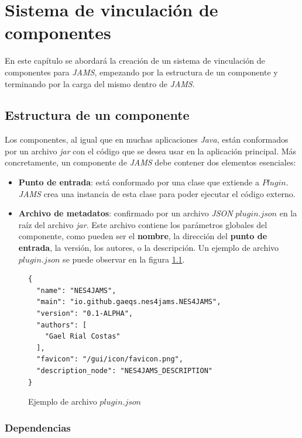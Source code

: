 \chapter{Sistema de vinculación de componentes}\label{ch:sistema-de-vinculacion-de-componentes}

En este capítulo se abordará la creación de un sistema de
vinculación de componentes para \textit{JAMS}, empezando por
la estructura de un componente y terminando por la carga
del mismo dentro de \textit{JAMS}.

\section{Estructura de un componente}\label{sec:estructura-de-un-componente}

Los componentes, al igual que en muchas aplicaciones \textit{Java},
están conformados por un archivo \textit{jar} con el código que
se desea usar en la aplicación principal.
Más concretamente, un componente de \textit{JAMS} debe contener
dos elementos esenciales:
\begin{itemize}
    \item \textbf{Punto de entrada}: está conformado por una
    clase que extiende a $Plugin$.
    \textit{JAMS} crea una instancia de esta clase para
    poder ejecutar el código externo.
    \item \textbf{Archivo de metadatos}: confirmado por un archivo
    \textit{JSON}\cite{JSON} $plugin.json$ en la raíz del archivo \textit{jar}.
    Este archivo contiene los parámetros globales del componente,
    como pueden ser el \textbf{nombre}, la dirección del
    \textbf{punto de entrada}, la versión, los autores,
    o la descripción.
    Un ejemplo de archivo $plugin.json$ se puede observar en la
    figura \ref{fig:plugin-json}.
\end{itemize}


\begin{figure}[h]
    \centering
    \begin{lstlisting}[frame=single,label={lst:plugin-json}]
{
  "name": "NES4JAMS",
  "main": "io.github.gaeqs.nes4jams.NES4JAMS",
  "version": "0.1-ALPHA",
  "authors": [
    "Gael Rial Costas"
  ],
  "favicon": "/gui/icon/favicon.png",
  "description_node": "NES4JAMS_DESCRIPTION"
}
    \end{lstlisting}
    \caption{Ejemplo de archivo $plugin.json$}
    \label{fig:plugin-json}
\end{figure}

\subsection{Dependencias}\label{subsec:dependencias}

